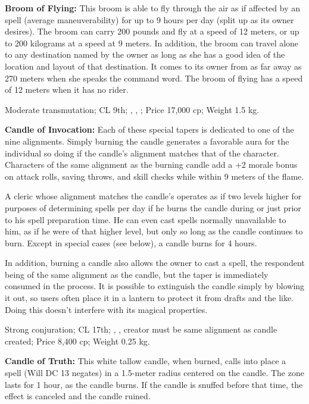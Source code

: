 \textbf{Broom of Flying:} This broom is able to fly through the air as if affected by an  spell (average maneuverability) for up to 9 hours per day (split up as its owner desires). The broom can carry 200 pounds and fly at a speed of 12 meters, or up to 200 kilograms at a speed at 9 meters. In addition, the broom can travel alone to any destination named by the owner as long as she has a good idea of the location and layout of that destination. It comes to its owner from as far away as 270 meters when she speaks the command word. The broom of flying has a speed of 12 meters when it has no rider.

Moderate transmutation; CL 9th; , , ; Price 17,000 cp; Weight 1.5 kg.



\textbf{Candle of Invocation:} Each of these special tapers is dedicated to one of the nine alignments. Simply burning the candle generates a favorable aura for the individual so doing if the candle's alignment matches that of the character. Characters of the same alignment as the burning candle add a +2 morale bonus on attack rolls, saving throws, and skill checks while within 9 meters of the flame.

A cleric whose alignment matches the candle's operates as if two levels higher for purposes of determining spells per day if he burns the candle during or just prior to his spell preparation time. He can even cast spells normally unavailable to him, as if he were of that higher level, but only so long as the candle continues to burn. Except in special cases (see below), a candle burns for 4 hours.

In addition, burning a candle also allows the owner to cast a  spell, the respondent being of the same alignment as the candle, but the taper is immediately consumed in the process. It is possible to extinguish the candle simply by blowing it out, so users often place it in a lantern to protect it from drafts and the like. Doing this doesn't interfere with its magical properties.

Strong conjuration; CL 17th; , , creator must be same alignment as candle created; Price 8,400 cp; Weight 0.25 kg.



\textbf{Candle of Truth:} This white tallow candle, when burned, calls into place a  spell (Will DC 13 negates) in a 1.5-meter radius centered on the candle. The zone lasts for 1 hour, as the candle burns. If the candle is snuffed before that time, the effect is canceled and the candle ruined.

